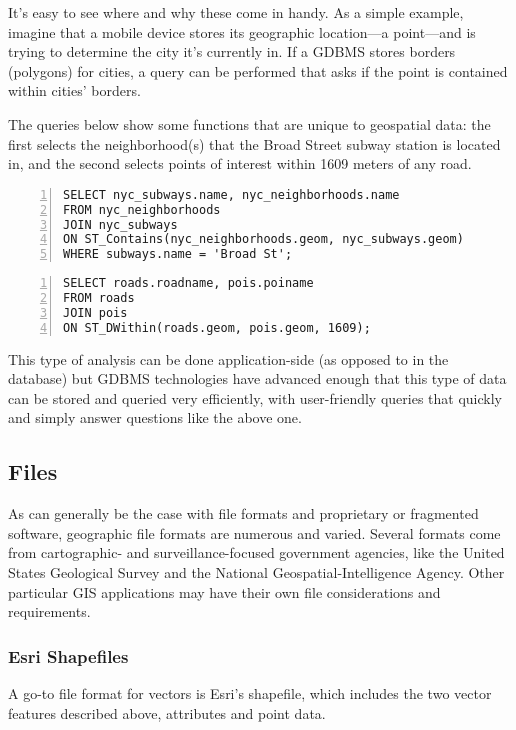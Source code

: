 It's easy to see where and why these come in handy. As a simple example, imagine that a mobile device stores its geographic location---a point---and is trying to determine the city it's currently in. If a GDBMS stores borders (polygons) for cities, a query can be performed that asks if the point is contained within cities' borders.

The queries below show some functions that are unique to geospatial data: the first selects the neighborhood(s) that the Broad Street subway station is located in, and the second selects points of interest within 1609 meters of any road.

\begin{Verbatim}[samepage=true,baselinestretch=1,numbers=left,xleftmargin=12mm]
SELECT nyc_subways.name, nyc_neighborhoods.name
FROM nyc_neighborhoods
JOIN nyc_subways
ON ST_Contains(nyc_neighborhoods.geom, nyc_subways.geom)
WHERE subways.name = 'Broad St';
\end{Verbatim}

\begin{Verbatim}[samepage=true,baselinestretch=1,numbers=left,xleftmargin=12mm]
SELECT roads.roadname, pois.poiname
FROM roads
JOIN pois 
ON ST_DWithin(roads.geom, pois.geom, 1609);
\end{Verbatim}

This type of analysis can be done application-side (as opposed to in the database) but GDBMS technologies have advanced enough that this type of data can be stored and queried very efficiently, with user-friendly queries that quickly and simply answer questions like the above one.

\subsection{Files}
\label{background_formats}
As can generally be the case with file formats and proprietary or fragmented software, geographic file formats are numerous and varied. Several formats come from cartographic- and surveillance-focused government agencies, like the United States Geological Survey and the National Geospatial-Intelligence Agency. Other particular GIS applications may have their own file considerations and requirements.

\subsubsection{Esri Shapefiles}
A go-to file format for vectors is Esri's shapefile, which includes the two vector features described above, attributes and point data.

